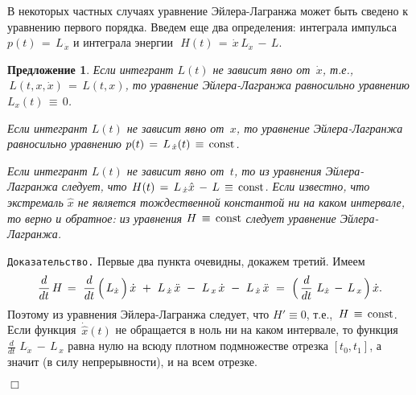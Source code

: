 \documentclass[12pt,a4paper]{article}
\newtheorem{prop}{Предложение}
\begin{document}
В некоторых частных случаях уравнение Эйлера-Лагранжа может быть
сведено к уравнению первого порядка. Введем еще два определения:
интеграла импульса $p(t)\, = \, L_{\, \dot x}$ и интеграла
энергии~$\, H(t)\, = \, \dot x \, L_{\dot x}\,  - \, L$.
\begin{prop}\label{p.impulse}
Если интегрант $L(t)$ не зависит явно от $\, \dot x$, т.е., $\,
L(t, x, \dot x)\, = \, L(t, x)$, то уравнение Эйлера-Лагранжа
равносильно уравнению $L_x(t)\, \equiv \, 0$.

Если интегрант $L(t)$ не зависит явно от $\, x$, то уравнение
Эйлера-Лагранжа равносильно уравнению $p(t)\, = \,  L_{\,
\dot x}(t)\, \equiv \, {\rm const}$.

Если интегрант $L(t)$ не зависит явно от $\, t$, то из уравнения
Эйлера-Лагранжа следует, что $ H(t)\, = \,  L_{\, \dot
x} {\hat x}\, - \, L\, \equiv \, {\rm const}$. Если известно,
что экстремаль $\hat x$ не является тождественной константой ни на
каком интервале, то верно и обратное: из уравнения $ H \,
\equiv \, {\rm const}$ следует уравнение Эйлера-Лагранжа.
\end{prop}
{\tt Доказательство.} Первые два пункта очевидны, докажем третий.
Имеем
$$
\frac{d}{dt}\, H\, = \,\, \frac{d}{dt}\, \Bigl( \, L_{\dot x}\, \Bigr)\, \dot x \
+ \ L_{\, \dot x}\, \ddot x \ - \ L_{\,  x}\, \dot x \ -  \ L_{\,
\dot x}\, \ddot x \ = \ \Bigl(\, \frac{d}{dt}\,  \, L_{\dot x}\, -
\, L_{\, x}\, \Bigr)\, \dot x.
$$
Поэтому из уравнения Эйлера-Лагранжа следует, что $ H' \equiv
0$, т.е., $\,  H \,  \equiv \, {\rm const}$. Если
функция~$\dot {\hat x}(t)$ не обращается в ноль ни на каком
интервале, то функция $\frac{d}{dt}\,  \,  L_{\dot x}\, - \,
 L_{\, x}$ равна нулю на всюду плотном подмножестве отрезка
$[t_0, t_1]$, а значит (в силу непрерывности), и на всем отрезке.

{\hfill $\Box$}
\smallskip
\end{document}
